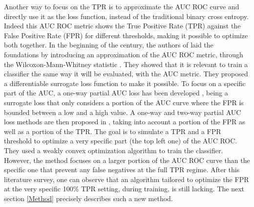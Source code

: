 Another way to focus on the TPR is to approximate the AUC ROC curve and directly use it as the loss function, instead of the traditional binary cross entropy. Indeed this AUC ROC metric shows the True Positive Rate (TPR) against the False Positive Rate (FPR) for different thresholds, making it possible to optimize both together. In the beginning of the  century, the authors of \cite{yan2003optimizing} laid the foundations by introducing an approximation of the AUC ROC metric, through the Wilcoxon-Mann-Whitney statistic \cite{mann1947test}. They showed that it is relevant to train a classifier the same way it will be evaluated, with the AUC metric. They proposed a differentiable surrogate loss function to make it possible. To focus on a specific part of the AUC, a one-way partial AUC loss has been developed \cite{dodd2003partial}, being a surrogate loss that only considers a portion of the AUC curve where the FPR is bounded between a low and a high value. A one-way and two-way partial AUC loss methods are then proposed in \cite{zhu2022auc}, taking into account a portion of the FPR as well as a portion of the TPR. The goal is to simulate a TPR and a FPR threshold to optimize a very specific part (the top left one) of the AUC ROC. They used a weakly convex optimization algorithm to train the classifier. However, the method focuses on a larger portion of the AUC ROC curve than the specific one that prevent any false negatives at the full TPR regime. After this literature survey, one can observe that an algorithm tailored to optimize the FPR at the very specific 100\% TPR setting, during training, is still lacking. The next section \ref{Method} precisely describes such a new method.
